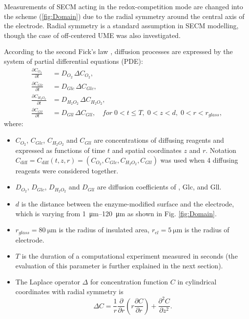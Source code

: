 Measurements of SECM acting in the redox-competition mode are changed into the scheme (\ref{fig:Domain}) due to the radial symmetry around the central axis of the electrode. Radial symmetry is a standard assumption in SECM modelling, though the case of off-centered UME was also investigated.

According to the second Fick’s law , diffusion processes are expressed by the system of partial differential equations (PDE):
\begin{equation}
  \begin{aligned}\label{eq:reakc_eq1}
  \frac{\partial C_{O_2}}{\partial t} &= D_{O_2}\,\Delta C_{O_2},\\
  \frac{\partial C_{Glc}}{\partial t} &= D_{Glc}\,\Delta C_{Glc},\\
  \frac{\partial C_{H_2 O_2}}{\partial t} &= D_{H_2 O_2} \,\Delta C_{H_2 O_2},\\
  \frac{\partial C_{Gll}}{\partial t} &= D_{Gll}\,\Delta C_{Gll},  \quad for\; 0<t\leq T,\; 0<z<d,\; 0<r<r_{glass},
  \end{aligned}
\end{equation}
where:
\begin{itemize}
  \item[] $C_{O_2}$, $C_{Glc}$, $C_{H_2 O_2}$ and $ C_{Gll}$ are concentrations of diffusing reagents and expressed as functions of time $t$ and spatial coordinates $z$ and $r$. Notation $C_{\text{diff}} = C_{\text{diff}} \left( t, z, r \right) = \left( C_{O_2}, C_{Glc}, \allowbreak C_{H_2 O_2}, \allowbreak C_{Gll} \right)$ was used when 4 diffusing re\-agents were considered together.
  \item[] $D_{O_2}$, $D_{Glc}$, $D_{H_2 O_2}$ and $D_{Gll}$ are diffusion coefficients of , Glc,  and Gll.
  \item[] $d$ is the distance between the enzyme-modified surface and the electrode, which is varying from \SIrange{1}{120}{\um} as shown in Fig. \ref{fig:Domain}.
  \item[] $r_{glass} = \SI{80}{\um}$ is the radius of insulated area, $r_{el} = \SI{5}{\um}$ is the radius of electrode.
  \item[] $T$ is the duration of a computational experiment measured in seconds (the evaluation of this parameter is further explained in the next section).
  \item[] The Laplace operator $\Delta$ for concentration function $C$ in cylindrical coordinates with radial symmetry is
  \begin{equation*}
  \Delta C = \frac{1}{r}\frac{\partial }{\partial r} \left( r\frac{\partial C }{\partial r} \right) + \frac{\partial^{2} C}{\partial z^{2}}.
  \end{equation*}
\end{itemize}

